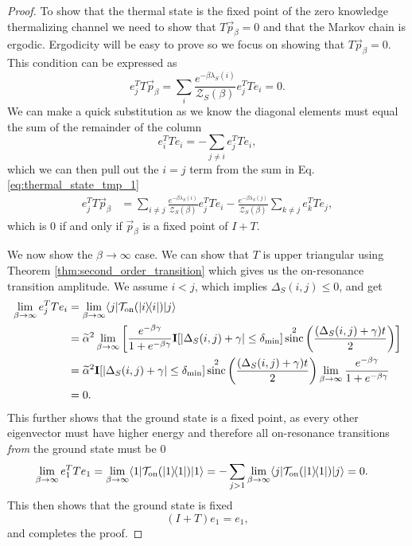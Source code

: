 \documentclass[
 amsmath,amssymb,
 aps,
onecolumn, 
nofootinbib]{revtex4-2}
\newcommand{\on}{\rm on}
\newcommand{\ket}[1]{|#1\rangle}
\newcommand{\bra}[1]{\langle #1|}
\newcommand{\ketbra}[2]{| #1\rangle\! \langle #2|}
\newcommand{\TT}{\mathcal{T}}
\newcommand{\partfun}{\mathcal{Z}}
\DeclareMathOperator{\sinc}{sinc}
\begin{document}
\begin{proof}
    To show that the thermal state is the fixed point of the zero knowledge thermalizing channel we need to show that 
$T \vec{p}_{\beta} = 0$ and that the Markov chain is ergodic. Ergodicity will be easy to prove so we focus on showing that $T \vec{p}_{\beta} = 0$. This condition can be expressed as
\begin{equation}
    e_j^T T \vec{p}_{\beta} = \sum_i \frac{e^{-\beta \lambda_S(i)}}{\partfun_S(\beta)} e_j^T T e_i = 0.   \label{eq:thermal_state_tmp_1}
\end{equation}
We can make a quick substitution as we know the diagonal elements must equal the sum of the remainder of the column 
\begin{equation}
    e_i^T T e_i = - \sum_{j \neq i} e_j^T T e_i,
\end{equation}
which we can then pull out the $i = j$ term from the sum in Eq. \eqref{eq:thermal_state_tmp_1}
\begin{align}
    e_j^T T \vec{p}_{\beta} &= \sum_{i \neq j} \frac{e^{-\beta \lambda_S(i)}}{\partfun_S(\beta)} e_j^T T e_i - \frac{e^{-\beta \lambda_S(j)}}{\partfun_S(\beta)} \sum_{k \neq j} e_k^T T e_j,
\end{align}
which is 0 if and only if $\vec{p}_{\beta}$ is a fixed point of $I + T$.

We now show the $\beta \to \infty$ case. We can show that $T$ is upper triangular using Theorem \ref{thm:second_order_transition} which gives us the on-resonance transition amplitude. We assume $i < j$, which implies $\Delta_S(i,j) \le 0$, and get
    \begin{align}
        \lim_{\beta \to \infty} e_j^T T e_i &= \lim_{\beta \to \infty} \bra{j} \TT_{\on}(\ketbra{i}{i}) \ket{j} \\
        &= \widetilde{\alpha}^2 \lim_{\beta \to \infty} \left[ \frac{e^{-\beta \gamma}}{1 + e^{-\beta \gamma}} \mathbf{I}[|\Delta_S(i,j) + \gamma| \le \delta_{\min}] \sinc^2 \left(\frac{(\Delta_S(i, j) + \gamma) t}{2} \right) \right] \\
        &= \widetilde{\alpha}^2 \mathbf{I}[|\Delta_S(i,j) + \gamma| \le \delta_{\min}] \sinc^2 \left(\frac{(\Delta_S(i, j) + \gamma) t}{2} \right) \lim_{\beta \to \infty} \frac{e^{-\beta \gamma}}{1 + e^{-\beta \gamma}} \\
        &= 0.
    \end{align}
    This further shows that the ground state is a fixed point, as every other eigenvector must have higher energy and therefore all on-resonance transitions \emph{from} the ground state must be 0
    \begin{align}
        \lim_{\beta \to \infty} e_1^T T e_1 &= \lim_{\beta \to \infty} \bra{1} \TT_{\on}(\ketbra{1}{1}) \ket{1} = -  \sum_{j > 1} \lim_{\beta \to \infty} \bra{j} \TT_{\on}(\ketbra{1}{1}) \ket{j}  = 0.
    \end{align}
    This then shows that the ground state is fixed
    \begin{equation}
        (I + T) e_1 = e_1,
    \end{equation}
    and completes the proof.
\end{proof}
\end{document}
